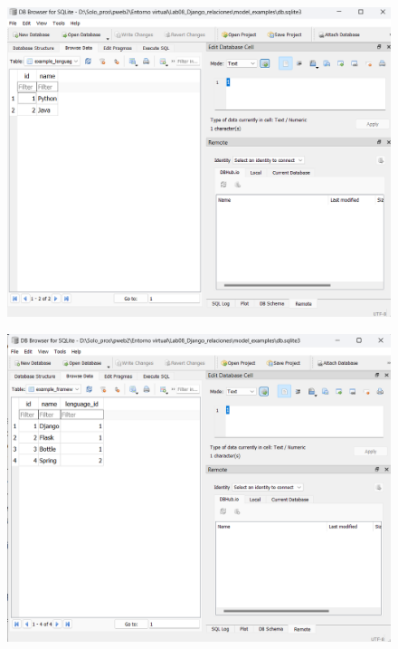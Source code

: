 \documentclass{article}
\begin{document}
	\begin{figure}[H]
		\centering
		\includegraphics[width=1.0\textwidth,keepaspectratio]{img/C1.png}
	\end{figure}
	\begin{figure}[H]
		\centering
		\includegraphics[width=1.0\textwidth,keepaspectratio]{img/C2.png}
	\end{figure}
\end{document}
